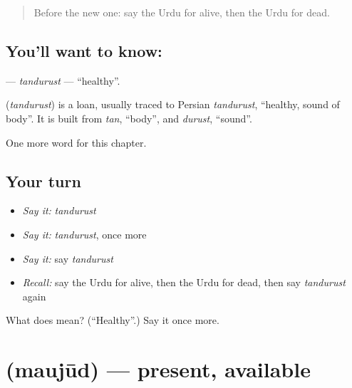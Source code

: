 \label{lesson:UR-C248-tandurust}



\begin{quote}
Before the new one: say the Urdu for alive, then the Urdu for dead.
\end{quote}

\subsection*{You'll want to know: }
\textbf{} — \emph{tandurust} — \textquotedblleft{}healthy\textquotedblright{}.

\begin{cousinweb}
\textbf{} (\emph{tandurust}) is a loan, usually traced to Persian \emph{tandurust}, \textquotedblleft{}healthy, sound of body\textquotedblright{}. It is built from \emph{tan}, \textquotedblleft{}body\textquotedblright{}, and \emph{durust}, \textquotedblleft{}sound\textquotedblright{}.
\end{cousinweb}

\begin{grammarlens}[title={What you've built}]
One more word for this chapter.
\end{grammarlens}

\subsection*{Your turn}
\begin{itemize}
\raggedright
  \item \emph{Say it:} \emph{tandurust}
  \item \emph{Say it:} \emph{tandurust}, once more
  \item \emph{Say it:} say \emph{tandurust}
  \item \emph{Recall:} say the Urdu for alive, then the Urdu for dead, then say \emph{tandurust} again
\end{itemize}

\begin{tcolorbox}[breakable,colback=teal!4,colframe=teal!35!black,title={Before you move on}]
What does  mean? (\textquotedblleft{}Healthy\textquotedblright{}.) Say it once more.
\end{tcolorbox}
\section[\texorpdfstring{\ur{موجود} (maujūd)}{موجود (maujūd)}]{ (maujūd) — present, available}

